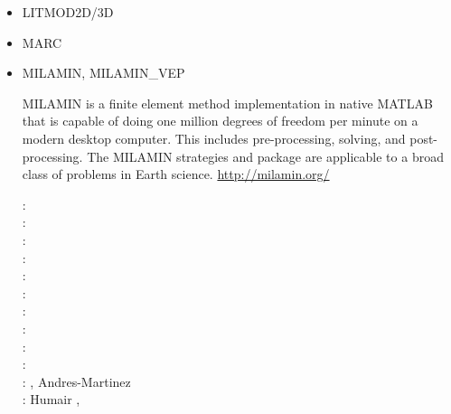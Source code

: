 \begin{itemize}
\begin{scriptsize}
\cite{sopg05}\cite{baso05}\cite{soba05}
\cite{bube06}\cite{basv06}\cite{sobk06}\cite{peso06}
\cite{peso08}\cite{baso08}\cite{scbe08}
\cite{sosk11}
\end{scriptsize}

\item LITMOD2D/3D

{\small 
\noindent
\cite{afrf07}
\cite{affr08}
\cite{fuac09}
\cite{fufa10}
\cite{jitf19}
}

\item MARC

{\small
\noindent
\cite{nesg97}
\cite{nesb99}
}


\item {\codefont MILAMIN, MILAMIN\_VEP} 

MILAMIN is a finite element method implementation in native MATLAB that is capable of doing one million degrees of freedom per minute on a modern desktop computer. This includes pre-processing, solving, and post-processing. The MILAMIN strategies and package are applicable to a broad class of problems in Earth science. \url{http://milamin.org/}

\begin{scriptsize}
\twothousandeight: \cite{daks08}\cite{scdk08}\\
\twothousandnine: \cite{gogk09}\\
\twothousandten: \cite{krda10}\cite{kaus10}\cite{dekc10}\\
\twothousandeleven: \cite{yakm11}\\
\twothousandtwelve: \cite{gebk12}\cite{rukb12}\cite{thka12}\\
\twothousandthirteen: \cite{scpo13}\\
\twothousandfourteen: \cite{jobk14}\\
\twothousandfifteen: \cite{lukz15}\cite{gehm15}\cite{thkp15}\cite{musd15}\\
\twothousandsixteen: \cite{jads16}\cite{maka16}\cite{cakp16}\\
\twothousandeighteen: \cite{dusd18}\cite{jasc18}\cite{jadg18}\cite{comj18}\cite{jens18}\cite{rabw18}\cite{chsm18}\\
\twothousandnineteen: \cite{sifg19}\cite{baba19}\cite{sogh19}, Andres-Martinez \etal \cite{anpa19}\\
\twothousandtwenty: Humair \etal \cite{hube20},
\end{scriptsize}


\end{itemize}
